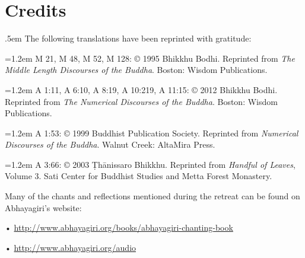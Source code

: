 \chapter{Credits}\label{credits}
{\parindent 0pt\parskip .5em
The following translations have been reprinted with gratitude:

\vspace{1em}\hangindent=1.2em
M 21, M 48, M 52, M 128: © 1995 Bhikkhu Bodhi. Reprinted from \emph{The
Middle Length Discourses of the Buddha}. Boston: Wisdom Publications.

\hangindent=1.2em
A 1:11, A 6:10, A 8:19, A 10:219, A 11:15: © 2012 Bhikkhu
Bodhi. Reprinted from \emph{The Numerical Discourses of the Buddha}.
Boston: Wisdom Publications.

\hangindent=1.2em A 1:53: © 1999 Buddhist Publication Society. Reprinted
from \emph{Numerical Discourses of the Buddha}. Walnut Creek: AltaMira
Press.

\hangindent=1.2em A 3:66: © 2003 Ṭhānissaro Bhikkhu. Reprinted from
\emph{Handful of Leaves}, Volume 3. Sati Center for Buddhist Studies
and Metta Forest Monastery.


\vspace{1.5em}
Many of the chants and reflections mentioned during the retreat can be
found on Abhayagiri's website:

•\hspace{.5em}
\href{http://www.abhayagiri.org/books/abhayagiri-chanting-book}
{http://www.abhayagiri.org/books/abhayagiri-chanting-book}

•\hspace{.5em} \href{http://www.abhayagiri.org/audio}
{http://www.abhayagiri.org/audio}

}

